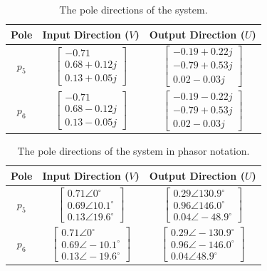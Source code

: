 \begin{table}[H]
	\centering
	\caption{The pole directions of the system.}
	\begin{tabular}{ccc}
		\hline
		\textbf{Pole} & \textbf{Input Direction ($V$)} & \textbf{Output Direction ($U$)} \\\hline
		$p_5$            & $ \begin{bmatrix} -0.71 \\ 0.68 + 0.12j \\ 0.13 + 0.05j\end{bmatrix} $ & $ \begin{bmatrix} -0.19+0.22j \\ -0.79+0.53j \\ 0.02 -0.03j\end{bmatrix} $ \\
		$p_6$            & $ \begin{bmatrix} -0.71 \\ 0.68 - 0.12j \\ 0.13 -0.05j\end{bmatrix} $ & $ \begin{bmatrix} -0.19-0.22j \\ -0.79+0.53j \\ 0.02 - 0.03j\end{bmatrix} $ \\\hline             
	\end{tabular}
	\label{tab: Pole Directions of system}
\end{table}

\begin{table}[H]
	\centering
	\caption{The pole directions of the system in phasor notation.}
	\begin{tabular}{ccc}
		\hline
		\textbf{Pole} & \textbf{Input Direction ($V$)} & \textbf{Output Direction ($U$)} \\\hline
		$p_5$            & $ \begin{bmatrix} 0.71\angle0^{\circ} \\ 0.69\angle10.1^{\circ} \\ 0.13\angle19.6^{\circ}\end{bmatrix} $ & $ \begin{bmatrix} 0.29\angle130.9^{\circ} \\ 0.96\angle146.0^{\circ} \\ 0.04\angle-48.9^{\circ}\end{bmatrix} $ \\
		$p_6$            & $ \begin{bmatrix} 0.71\angle0^{\circ} \\ 0.69\angle-10.1^{\circ} \\ 0.13\angle-19.6^{\circ}\end{bmatrix} $ & $ \begin{bmatrix} 0.29\angle-130.9^{\circ} \\ 0.96\angle-146.0^{\circ} \\ 0.04\angle48.9^{\circ}\end{bmatrix} $ \\\hline             
	\end{tabular}
	\label{tab: Pole Directions of system Phasor Notation}
\end{table}


